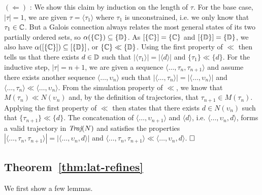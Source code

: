 

$(\Leftarrow)$ : We show this claim by induction on the length of $\tau$. For the base case, $| \tau | = 1$, we are given $\tau = \langle \tau_{1} \rangle$ where $\tau_{1}$ is unconstrained, i.e. we only know that $\tau_{1} \in \mathbb{C}$. But a Galois connection always relates the most general states of its two partially ordered sets, so $\alpha(\{ \mathbb{C} \}) \subseteq \{ \mathbb{D} \}$. As $[\{ \mathbb{C} \}] = \{ \mathbb{C} \}$ and $[\{ \mathbb{D} \}] = \{ \mathbb{D} \}$, we also have $\alpha([\{ \mathbb{C} \}]) \subseteq [\{ \mathbb{D} \}]$, or $\{ \mathbb{C} \} \ll \{ \mathbb{D} \}$. Using the first property of $\ll$ then tells us that there exists $d \in \mathbb{D}$ such that $|\langle \tau_{1} \rangle| = |\langle d \rangle|$ and $\{ \tau_{1} \} \ll \{ d \}$. For the inductive step, $| \tau | = n + 1$, we are given a sequence $\langle \dots, \tau_{n}, \tau_{n+1} \rangle$ and assume there exists another sequence $\langle \dots, \upsilon_{n} \rangle$ such that $|\langle \dots, \tau_{n} \rangle| = |\langle \dots, \upsilon_{n} \rangle|$ and $\langle \dots, \tau_{n} \rangle \ll \langle \dots, \upsilon_{n} \rangle$. From the simulation property of $\ll$, we know that $M(\tau_{n}) \ll N(\upsilon_{n})$ and, by the definition of trajectories, that $\tau_{n+1} \in M(\tau_{n})$. Applying the first property of $\ll$ then states that there exists $d \in N(\upsilon_{n})$ such that $\{ \tau_{n+1} \} \ll \{ d \}$. The concatenation of $\langle \dots, \upsilon_{n+1} \rangle$ and $\langle d \rangle$, i.e. $\langle \dots, \upsilon_{n}, d \rangle$, forms a valid trajectory in $\operatorname{\textit{Traj}}(N)$ and satisfies the properties $| \langle \dots, \tau_{n}, \tau_{n+1} \rangle | = | \langle \dots, \upsilon_{n}, d \rangle |$ and $\langle \dots, \tau_{n}, \tau_{n+1} \rangle \ll \langle \dots, \upsilon_{n}, d \rangle$. $\qedbox$


\subsection{Theorem~\ref{thm:lat-refines}}

We first show a few lemmas.

